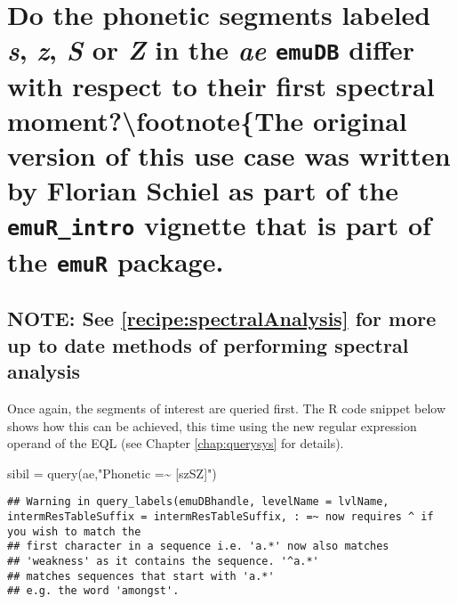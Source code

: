 \documentclass[
]{book}
\newenvironment{Shaded}{\begin{snugshade}}{\end{snugshade}}
\newcommand{\FunctionTok}[1]{\textcolor[rgb]{0.00,0.00,0.00}{#1}}
\newcommand{\NormalTok}[1]{#1}
\newcommand{\OtherTok}[1]{\textcolor[rgb]{0.56,0.35,0.01}{#1}}
\newcommand{\StringTok}[1]{\textcolor[rgb]{0.31,0.60,0.02}{#1}}
\begin{document}
\hypertarget{sec:app-chap-useCases-q4}{%
\section{\texorpdfstring{Do the phonetic segments labeled \emph{s}, \emph{z}, \emph{S} or \emph{Z} in the \emph{ae} \texttt{emuDB} differ with respect to their first spectral moment?\protect\textbackslash footnote\{The original version of this use case was written by Florian Schiel as part of the \texttt{emuR\_intro} vignette that is part of the \texttt{emuR} package.}{Do the phonetic segments labeled s, z, S or Z in the ae emuDB differ with respect to their first spectral moment?\textbackslash footnote\{The original version of this use case was written by Florian Schiel as part of the emuR\_intro vignette that is part of the emuR package.}}\label{sec:app-chap-useCases-q4}}

\hypertarget{note-see-refrecipespectralanalysis-for-more-up-to-date-methods-of-performing-spectral-analysis}{%
\subsection{NOTE: See \ref{recipe:spectralAnalysis} for more up to date methods of performing spectral analysis}\label{note-see-refrecipespectralanalysis-for-more-up-to-date-methods-of-performing-spectral-analysis}}

Once again, the segments of interest are queried first. The R code snippet below shows how this can be achieved, this time using the new regular expression operand of the EQL (see Chapter \ref{chap:querysys} for details).

\begin{Shaded}
\begin{Highlighting}[]
\NormalTok{sibil }\OtherTok{=} \FunctionTok{query}\NormalTok{(ae,}\StringTok{"Phonetic =\textasciitilde{} \textquotesingle{}[szSZ]\textquotesingle{}"}\NormalTok{)}
\end{Highlighting}
\end{Shaded}

\begin{verbatim}
## Warning in query_labels(emuDBhandle, levelName = lvlName, intermResTableSuffix = intermResTableSuffix, : =~ now requires ^ if you wish to match the
## first character in a sequence i.e. 'a.*' now also matches
## 'weakness' as it contains the sequence. '^a.*'
## matches sequences that start with 'a.*'
## e.g. the word 'amongst'.
\end{verbatim}
\end{document}
